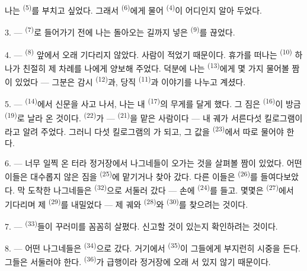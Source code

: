 나는  \textsuperscript{(5)}를 부치고 싶었다. 그래서 
\textsuperscript{(6)}에게 물어  \textsuperscript{(4)}이 어디인지 알아
두었다.

3. ---  \textsuperscript{(7)}로 들어가기 전에 나는 돌아오는 길까지 넣은
 \textsuperscript{(9)}를 끊었다.

4. ---  \textsuperscript{(8)} 앞에서 오래 기다리지 않았다. 사람이 적었기
때문이다. 휴가를 떠나는  \textsuperscript{(10)} 하나가 친절히 제 차례를 나에게
양보해 주었다. 덕분에 나는  \textsuperscript{(13)}에게 몇 가지 물어볼 짬이
있었다 — 그분은 감시  \textsuperscript{(12)}과, 당직 
\textsuperscript{(11)}과 이야기를 나누고 계셨다.

\VUsaut{3.0mm}

5. ---  \textsuperscript{(14)}에서 신문을 사고 나서, 나는 내 
\textsuperscript{(17)}의 무게를 달게 했다. 그 짐은  \textsuperscript{(16)}이
방금  \textsuperscript{(19)}로 날라 온 것이다. 
\textsuperscript{(22)}가 —  \textsuperscript{(21)}을 맡은 사람이다 — 내 궤가
서른다섯 킬로그램이라고 알려 주었다. 그러니 다섯 킬로그램의 가 되고,
그 값을  \textsuperscript{(23)}에서 따로 물어야 한다.

6. --- 너무 일찍 온 터라 정거장에서 나그네들이 오가는 것을 살펴볼 짬이 있었다. 어떤
이들은 대수롭지 않은 짐을  \textsuperscript{(25)}에 맡기거나 찾아
갔다. 다른 이들은  \textsuperscript{(26)}를 들여다보았다. 막 도착한
나그네들은  \textsuperscript{(32)}으로 서둘러 갔다 — 손에
 \textsuperscript{(24)}를 들고. 몇몇은 
\textsuperscript{(27)}에서 기다리며 제  \textsuperscript{(29)}를 내밀었다 —
제 궤와  \textsuperscript{(28)}와  \textsuperscript{(30)}를
찾으려는 것이다.

7. ---  \textsuperscript{(33)}들이 꾸러미를 꼼꼼히 살폈다. 신고할 것이
있는지 확인하려는 것이다.

8. --- 어떤 나그네들은  \textsuperscript{(34)}으로 갔다. 거기에서
 \textsuperscript{(35)}이 그들에게 부지런히 시중을 든다. 그들은 서둘러야
한다.  \textsuperscript{(36)}가 급행이라 정거장에 오래 서 있지 않기 때문이다.

